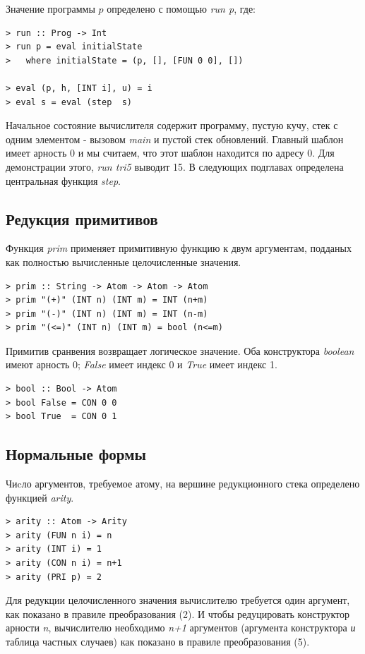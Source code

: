 \documentclass[flenqn, 14pt]{extarticle}
\begin{document}
Значение программы $p$ определено с помощью \textit{run p}, где:
\begin{verbatim}
> run :: Prog -> Int
> run p = eval initialState
>   where initialState = (p, [], [FUN 0 0], [])

> eval (p, h, [INT i], u) = i
> eval s = eval (step  s)
\end{verbatim}

Начальное состояние вычислителя содержит программу, пустую кучу, стек с одним элементом - вызовом \textit{main} и пустой стек обновлений. Главный шаблон имеет арность 0 и мы считаем, что этот шаблон находится по адресу 0. Для демонстрации этого, \textit{run tri5} выводит 15. В следующих подглавах определена центральная функция \textit{step}.

\subsection{Редукция примитивов}
Функция \textit{prim} применяет примитивную функцию к двум аргументам, подданых как полностью вычисленные целочисленные значения.
\begin{verbatim}
> prim :: String -> Atom -> Atom -> Atom
> prim "(+)" (INT n) (INT m) = INT (n+m)
> prim "(-)" (INT n) (INT m) = INT (n-m)
> prim "(<=)" (INT n) (INT m) = bool (n<=m)
\end{verbatim}

Примитив сранвения возвращает логическое значение. Оба конструктора \textit{boolean} имеют арность 0; \textit{False} имеет индекс 0 и \textit{True} имеет индекс 1.

\begin{verbatim}
> bool :: Bool -> Atom
> bool False = CON 0 0
> bool True  = CON 0 1
\end{verbatim}

\subsection{Нормальные формы}
Чиcло аргументов, требуемое атому, на вершине редукционного стека определено функцией \textit{arity}.
\begin{verbatim}
> arity :: Atom -> Arity
> arity (FUN n i) = n
> arity (INT i) = 1
> arity (CON n i) = n+1
> arity (PRI p) = 2
\end{verbatim}

Для редукции целочисленного значения вычислителю требуется один аргумент, как показано в правиле преобразования (2). И чтобы редуцировать конструктор арности \textit{n}, вычислителю необходимо \textit{n+1} аргументов (аргумента конструктора \textit{и} таблица частных случаев) как показано в правиле преобразования (5).
\end{document}
